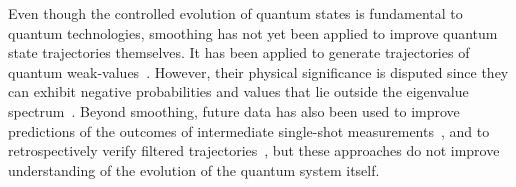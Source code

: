 \documentclass[aps,prx,twocolumn,amsmath,amssymb,superscriptaddress,floatfix,longbibliography
]{revtex4-2}
\begin{document}
Even though the controlled evolution of quantum states is fundamental to quantum technologies, smoothing has not yet been applied to improve quantum state trajectories themselves. It has been applied to generate trajectories of quantum weak-values~\cite{Kocsis2011observing,Bliokh2013photon}. However, 
their physical significance is disputed since they can exhibit negative probabilities and values that lie outside the eigenvalue spectrum~\cite{Aharonov1988how,leggett1989comment,ferrie2014result}.
Beyond smoothing, future data has also been used to improve predictions of the outcomes of intermediate single-shot measurements~\cite{gammelmark2013past,rybarczyk2015forward,tan2015prediction},
and to retrospectively verify filtered trajectories~\cite{miao2010probing,rossi2019observing,meng2022measurement,lammers2024quantum}, but these approaches do not improve understanding of the evolution of the quantum system itself.


\end{document}
